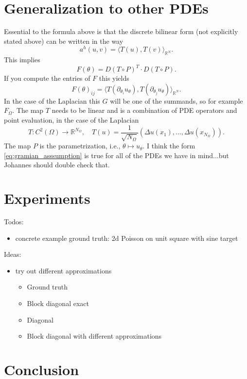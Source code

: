 \documentclass[11pt]{article}
\theoremstyle{definition}
\theoremstyle{plain}
\begin{document}
\section{Generalization to other PDEs}
Essential to the formula above is that the discrete bilinear form (not explicitly stated above) can be written in the way
\begin{equation}\label{eq:gramian_asssumption}
  a^h(u,v)
  =
  \langle T(u), T(v) \rangle_{\mathbb R^N}.
\end{equation}
This implies
\begin{equation*}
  F(\theta) = D(T\circ P)^T \cdot D(T \circ P).
\end{equation*}
If you compute the entries of $F$ this yields
\begin{equation*}
  F(\theta)_{ij} = \langle T(\partial_{\theta_i}u_\theta), T(\partial_{\theta_j}u_\theta) \rangle_{\mathbb R^N}.
\end{equation*}
In the case of the Laplacian this $G$ will be one of the summands, so for example $F_\Omega$.
The map $T$ needs to be linear and is a combination of PDE operators and point evaluation, in the case of the Laplacian
\begin{equation*}
  T:C^2(\Omega) \to \mathbb R^{N_\Omega}, \quad T(u) = \frac{1}{\sqrt{N_{\Omega}}}(\Delta u(x_1), \dots, \Delta u(x_{N_{\Omega}})).
\end{equation*}
The map $P$ is the parametrization, i.e., $\theta\mapsto u_\theta$.
I think the form \eqref{eq:gramian_asssumption} is true for all of the PDEs we have in mind...but Johannes should double check that.



\section{Experiments}

Todos:
\begin{itemize}
    \item concrete example ground truth: 2d Poisson on unit square with sine target
\end{itemize}

Ideas:
\begin{itemize}
    \item try out different approximations
    \begin{itemize}
        \item Ground truth
        \item Block diagonal exact
        \item Diagonal 
        \item Block diagonal with different approximations
    \end{itemize}
\end{itemize}

\section{Conclusion}






\end{document}
